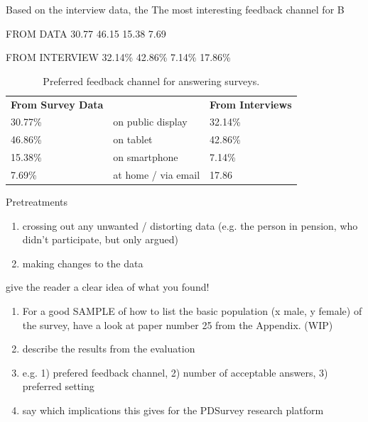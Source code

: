Based on the interview data, the 
The most interesting feedback channel for 
B 


FROM DATA
30.77%
46.15%
15.38%
7.69%

FROM INTERVIEW
32.14\%
42.86\%
7.14\%
17.86\%






\begin{table}[h]
\center
\begin{tabular}{lllll}
\multicolumn{2}{l}{\textbf{From Survey Data}} &  & \multicolumn{2}{l}{\textbf{From Interviews}} \\
30.77\%                   & \multicolumn{3}{l}{on public display}    & 32.14\%                  \\
46.86\%                   & \multicolumn{3}{l}{on tablet}            & 42.86\%                  \\
15.38\%                   & \multicolumn{3}{l}{on smartphone}        & 7.14\%                   \\
7.69\%                    & \multicolumn{3}{l}{at home / via email}  & 17.86                   
\end{tabular}
\caption[Feedback Channel]{Preferred feedback channel for answering surveys.}
\end{table}




	Pretreatments
	\begin{enumerate}
	\item crossing out any unwanted / distorting data (e.g. the person in pension, who didn't participate, but only argued)
	\item making changes to the data
	\end{enumerate}




	give the reader a clear idea of what you found!


	\begin{enumerate}
	\item For a good SAMPLE of how to list the basic population (x male, y female) of the survey, have a look at paper number 25 from the Appendix. (WIP)
	\item describe the results from the evaluation
	\item e.g. 1) prefered feedback channel, 2) number of acceptable answers, 3) preferred setting
	\item say which implications this gives for the PDSurvey research platform
	\end{enumerate}
	


